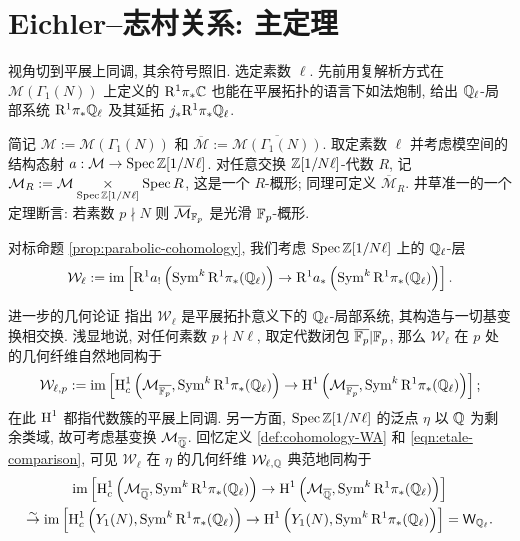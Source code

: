 \section{Eichler--志村关系: 主定理}\label{sec:Eichler-Shimura-cong-2}
视角切到平展上同调, 其余符号照旧. 选定素数 $\ell$. 先前用复解析方式在 $\mathcal{M}(\Gamma_1(N))$ 上定义的 $\mathrm{R}^1 \pi_* \mathbb{C}$ 也能在平展拓扑的语言下如法炮制, 给出 $\mathbb{Q}_\ell$-局部系统 $\mathrm{R}^1 \pi_* \mathbb{Q}_\ell$ 及其延拓 $j_* \mathrm{R}^1 \pi_* \mathbb{Q}_\ell$.

简记 $\mathcal{M} := \mathcal{M}(\Gamma_1(N))$ 和 $\overline{\mathcal{M}} := \overline{\mathcal{M}(\Gamma_1(N))}$. 取定素数 $\ell$ 并考虑模空间的结构态射 $a: \mathcal{M} \to \operatorname{Spec} \mathbb{Z}[1/N\ell]$. 对任意交换 $\mathbb{Z}[1/N\ell]$-代数 $R$, 记 $\mathcal{M}_R := \mathcal{M} \underset{\operatorname{Spec}\mathbb{Z}[1/N\ell]}{\times} \operatorname{Spec} R$, 这是一个 $R$-概形; 同理可定义 $\overline{\mathcal{M}}_R$. 井草准一的一个定理断言: 若素数 $p \nmid N$ 则 $\overline{\mathcal{M}}_{\mathbb{F}_p}$ 是光滑 $\mathbb{F}_p$-概形.

对标命题 \ref{prop:parabolic-cohomology}, 我们考虑 $\operatorname{Spec} \mathbb{Z}[1/N\ell]$ 上的 $\mathbb{Q}_\ell$-层
\begin{equation*}
	\mathcal{W}_\ell := \operatorname{im}\left[ \mathrm{R}^1 a_! \left( \operatorname{Sym}^k \mathrm{R}^1 \pi_* (\mathbb{Q}_\ell) \right) \to \mathrm{R}^1 a_* \left( \operatorname{Sym}^k \mathrm{R}^1 \pi_* (\mathbb{Q}_\ell) \right) \right].
\end{equation*}

进一步的几何论证 \cite[p.161]{Del71} 指出 $\mathcal{W}_\ell$ 是平展拓扑意义下的 $\mathbb{Q}_\ell$-局部系统, 其构造与一切基变换相交换. 浅显地说, 对任何素数 $p \nmid N\ell$, 取定代数闭包 $\overline{\mathbb{F}_p} | \mathbb{F}_p$, 那么 $\mathcal{W}_\ell$ 在 $p$ 处的几何纤维自然地同构于
\begin{equation}\label{eqn:parabolic-cohomology-p}
	\mathcal{W}_{\ell, p} := \operatorname{im}\left[ \operatorname{H}_c^1\left(\mathcal{M}_{\overline{\mathbb{F}_p}}, \operatorname{Sym}^k \mathrm{R}^1 \pi_* (\mathbb{Q}_\ell) \right) \to \operatorname{H}^1\left(\mathcal{M}_{\overline{\mathbb{F}_p}}, \operatorname{Sym}^k \mathrm{R}^1 \pi_* (\mathbb{Q}_\ell) \right) \right];
\end{equation}
在此 $\operatorname{H}^1$ 都指代数簇的平展上同调. 另一方面, $\operatorname{Spec} \mathbb{Z}[1/N\ell]$ 的泛点 $\eta$ 以 $\mathbb{Q}$ 为剩余类域, 故可考虑基变换 $\mathcal{M}_{\overline{\mathbb{Q}}}$. 回忆定义 \ref{def:cohomology-WA} 和 \eqref{eqn:etale-comparison}, 可见 $\mathcal{W}_\ell$ 在 $\eta$ 的几何纤维 $\mathcal{W}_{\ell, \mathbb{Q}}$ 典范地同构于 
\begin{multline*}
	\operatorname{im}\left[ \operatorname{H}_c^1\left(\mathcal{M}_{\overline{\mathbb{Q}}}, \operatorname{Sym}^k \mathrm{R}^1 \pi_* (\mathbb{Q}_\ell) \right) \to \operatorname{H}^1\left(\mathcal{M}_{\overline{\mathbb{Q}}}, \operatorname{Sym}^k \mathrm{R}^1 \pi_* (\mathbb{Q}_\ell) \right) \right] \\
	\stackrel{\sim}{\rightarrow} \operatorname{im}\left[ \operatorname{H}_c^1\left(Y_1(N), \operatorname{Sym}^k \mathrm{R}^1 \pi_* (\mathbb{Q}_\ell) \right) \to \operatorname{H}^1\left(Y_1(N), \operatorname{Sym}^k \mathrm{R}^1 \pi_* (\mathbb{Q}_\ell) \right) \right] = \mathsf{W}_{\mathbb{Q}_\ell}.
\end{multline*}

